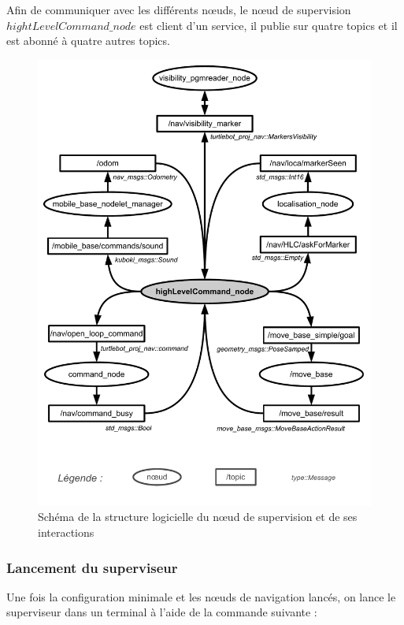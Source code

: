 \documentclass[10pt,a4paper]{article}
\begin{document}
Afin de communiquer avec les différents nœuds, le nœud de supervision $hightLevelCommand\_node$ est client d'un service, il publie sur quatre topics et il est abonné à quatre autres topics.


\begin{figure}[!h]
\centering\includegraphics[scale=0.6]{figures/HLC_ROS_struc.pdf}
\caption{Schéma de la structure logicielle du nœud de supervision et de ses interactions }
\label{HLC_ROS_struc}
\end{figure}

\subsubsection{Lancement du superviseur}
\label{sec:LancementDuSuperviseur}

Une fois la configuration minimale et les nœuds de navigation lancés, on lance le superviseur dans un terminal à l'aide de la commande suivante :\\
\end{document}
